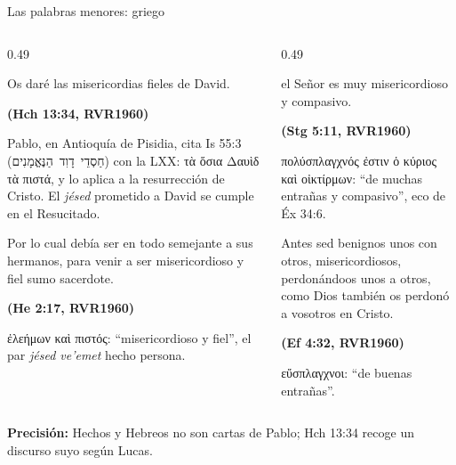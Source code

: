 \documentclass[hyperref={bookmarks=false},aspectratio=169]{beamer}
\newcommand{\heb}[1]{\mbox{\foreignlanguage{hebrew}{#1}}}
\newcommand{\grc}[1]{\foreignlanguage{ancientgreek}{#1}}
\newcommand{\fuente}[1]{\par\hfill{\upshape\bfseries\footnotesize\textcolor{azul}{#1}}}
\newcommand{\precision}[1]{{\footnotesize\color{gris}\textbf{Precisión:} #1}}
\begin{document}
\begin{frame}{Las palabras menores: griego}
\begin{columns}[t,onlytextwidth]
\begin{column}{0.49\textwidth}
\begin{cita}Os daré las misericordias fieles de David.\fuente{(Hch 13:34, RVR1960)}\end{cita}
\scriptsize Pablo, en Antioquía de Pisidia, cita Is 55:3 (\heb{חַסְדֵי דָוִד הַנֶּאֱמָנִים}) con la LXX: \grc{τὰ ὅσια Δαυὶδ τὰ πιστά}, y lo aplica a la resurrección de Cristo. El \emph{jésed} prometido a David se cumple en el Resucitado.
\begin{cita}Por lo cual debía ser en todo semejante a sus hermanos, para venir a ser misericordioso y fiel sumo sacerdote.\fuente{(He 2:17, RVR1960)}\end{cita}
\scriptsize\grc{ἐλεήμων καὶ πιστός}: ``misericordioso y fiel'', el par \emph{jésed ve'emet} hecho persona.
\end{column}
\begin{column}{0.49\textwidth}
\begin{cita}el Señor es muy misericordioso y compasivo.\fuente{(Stg 5:11, RVR1960)}\end{cita}
\scriptsize\grc{πολύσπλαγχνός ἐστιν ὁ κύριος καὶ οἰκτίρμων}: ``de muchas entrañas y compasivo'', eco de Éx 34:6.
\begin{cita}Antes sed benignos unos con otros, misericordiosos, perdonándoos unos a otros, como Dios también os perdonó a vosotros en Cristo.\fuente{(Ef 4:32, RVR1960)}\end{cita}
\scriptsize\grc{εὔσπλαγχνοι}: ``de buenas entrañas''.
\end{column}
\end{columns}
\precision{Hechos y Hebreos no son cartas de Pablo; Hch 13:34 recoge un discurso suyo según Lucas.}
\end{frame}
\end{document}
